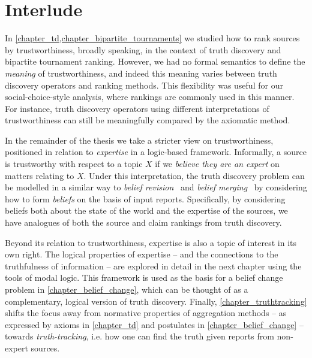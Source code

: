 \chapter*{Interlude}

In \cref{chapter_td,chapter_bipartite_tournaments} we studied how to rank
sources by trustworthiness, broadly speaking, in the context of truth discovery
and bipartite tournament ranking. However, we had no formal semantics to define
the \emph{meaning} of trustworthiness, and indeed this meaning varies between
truth discovery operators and ranking methods. This flexibility was useful for
our social-choice-style analysis, where rankings are commonly used in this
manner. For instance, truth discovery operators using different interpretations
of trustworthiness can still be meaningfully compared by the axiomatic method.

In the remainder of the thesis we take a stricter view on trustworthiness,
positioned in relation to \emph{expertise} in a logic-based framework.
Informally, a source is trustworthy with respect to a topic $X$ if we
\emph{believe they are an expert} on matters relating to $X$. Under this
interpretation, the truth discovery problem can be modelled in a similar way to
\emph{belief revision}~\cite{alchourron1985logic} and \emph{belief
merging}~\cite{konieczny2002merging} by considering how to form \emph{beliefs}
on the basis of input reports. Specifically, by considering beliefs both about
the state of the world and the expertise of the sources, we have analogues of
both the source and claim rankings from truth discovery.

Beyond its relation to trustworthiness, expertise is also a topic of interest
in its own right. The logical properties of expertise -- and the connections to
the truthfulness of information -- are explored in detail in the next chapter
using the tools of modal logic. This framework is used as the basis for a
belief change problem in \cref{chapter_belief_change}, which can be thought of
as a complementary, logical version of truth discovery. Finally,
\cref{chapter_truthtracking} shifts the focus away from normative properties of
aggregation methods -- as expressed by axioms in \cref{chapter_td} and
postulates in \cref{chapter_belief_change} -- towards \emph{truth-tracking},
i.e. how one can find the truth given reports from non-expert sources.
